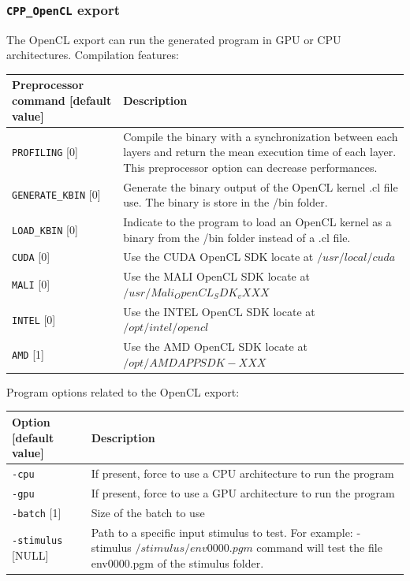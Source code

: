 \documentclass[a4paper,11pt,oneside]{article}
\newcommand{\iponly}{\reversemarginpar
    \marginnote{\color{listletiblue}\normalfont\scriptsize
    {\ttfamily{}\hyperref[sec:N2D2-IP]{\color{listletiblue}N2D2 IP}} \emph{only}}}
\begin{document}
\subsubsection{\texorpdfstring{%
\lstinline[basicstyle=\ttfamily\bfseries]!CPP_OpenCL! export\protect\iponly}
{CPP\_OpenCL export}}
The OpenCL export can run the generated program in GPU or CPU architectures.
Compilation features:
\begin{center}
 \begin{tabular}{| p{7cm} | p{8cm} | }
 \hline
 Preprocessor command [default value] & Description\\
 \hline\hline
  \lstinline!PROFILING! [0] & Compile the binary with a synchronization between
   each layers and return the mean execution time of each layer.
  This preprocessor option can decrease performances.\\
  \lstinline!GENERATE_KBIN! [0] & Generate the binary output of the OpenCL
  kernel .cl file use. The binary is store in the /bin folder. \\
  \lstinline!LOAD_KBIN! [0] & Indicate to the program to load an OpenCL
  kernel as a binary from the /bin folder instead of a .cl file. \\
  \lstinline!CUDA! [0] & Use the CUDA OpenCL SDK locate at
  ${/usr/local/cuda}$ \\
  \lstinline!MALI! [0] & Use the MALI OpenCL SDK locate at
  ${/usr/Mali_OpenCL_SDK_vXXX}$ \\
  \lstinline!INTEL! [0] & Use the INTEL OpenCL SDK locate at
  ${/opt/intel/opencl}$ \\
  \lstinline!AMD! [1] & Use the AMD OpenCL SDK locate at
  ${/opt/AMDAPPSDK-XXX}$ \\
 \hline
\end{tabular}
\end{center}

Program options related to the OpenCL export:
\begin{center}
 \begin{tabular}{| p{5cm} | p{10cm} | }
 \hline
 Option [default value] & Description\\
 \hline\hline
  \lstinline!-cpu! & If present, force to use a CPU architecture to run
  the program \\
  \lstinline!-gpu! & If present, force to use a GPU architecture to run
  the program \\
  \lstinline!-batch! [1] & Size of the batch to use \\
  \lstinline!-stimulus! [NULL] & Path to a specific input stimulus to test.
  For example: -stimulus ${/stimulus/env0000.pgm}$ command will test the file
  env0000.pgm  of the stimulus folder.\\
 \hline
\end{tabular}
\end{center}
\end{document}
